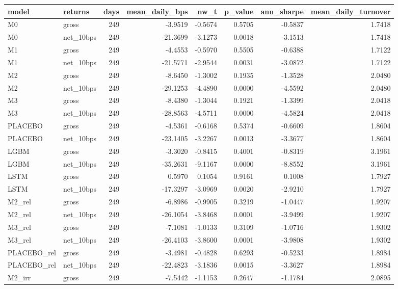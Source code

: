 \begin{tabular}{llrrrrrr}
\toprule
model & returns & days & mean\_daily\_bps & nw\_t & p\_value & ann\_sharpe & mean\_daily\_turnover \\
\midrule
M0 & gross & 249 & -3.9519 & -0.5674 & 0.5705 & -0.5837 & 1.7418 \\
M0 & net\_10bps & 249 & -21.3699 & -3.1273 & 0.0018 & -3.1513 & 1.7418 \\
M1 & gross & 249 & -4.4553 & -0.5970 & 0.5505 & -0.6388 & 1.7122 \\
M1 & net\_10bps & 249 & -21.5771 & -2.9544 & 0.0031 & -3.0872 & 1.7122 \\
M2 & gross & 249 & -8.6450 & -1.3002 & 0.1935 & -1.3528 & 2.0480 \\
M2 & net\_10bps & 249 & -29.1253 & -4.4890 & 0.0000 & -4.5592 & 2.0480 \\
M3 & gross & 249 & -8.4380 & -1.3044 & 0.1921 & -1.3399 & 2.0418 \\
M3 & net\_10bps & 249 & -28.8563 & -4.5711 & 0.0000 & -4.5824 & 2.0418 \\
PLACEBO & gross & 249 & -4.5361 & -0.6168 & 0.5374 & -0.6609 & 1.8604 \\
PLACEBO & net\_10bps & 249 & -23.1405 & -3.2267 & 0.0013 & -3.3677 & 1.8604 \\
LGBM & gross & 249 & -3.3020 & -0.8415 & 0.4001 & -0.8319 & 3.1961 \\
LGBM & net\_10bps & 249 & -35.2631 & -9.1167 & 0.0000 & -8.8552 & 3.1961 \\
LSTM & gross & 249 & 0.5970 & 0.1054 & 0.9161 & 0.1008 & 1.7927 \\
LSTM & net\_10bps & 249 & -17.3297 & -3.0969 & 0.0020 & -2.9210 & 1.7927 \\
M2\_rel & gross & 249 & -6.8986 & -0.9905 & 0.3219 & -1.0447 & 1.9207 \\
M2\_rel & net\_10bps & 249 & -26.1054 & -3.8468 & 0.0001 & -3.9499 & 1.9207 \\
M3\_rel & gross & 249 & -7.1081 & -1.0133 & 0.3109 & -1.0716 & 1.9302 \\
M3\_rel & net\_10bps & 249 & -26.4103 & -3.8600 & 0.0001 & -3.9808 & 1.9302 \\
PLACEBO\_rel & gross & 249 & -3.4981 & -0.4828 & 0.6293 & -0.5233 & 1.8984 \\
PLACEBO\_rel & net\_10bps & 249 & -22.4823 & -3.1836 & 0.0015 & -3.3627 & 1.8984 \\
M2\_irr & gross & 249 & -7.5442 & -1.1153 & 0.2647 & -1.1784 & 2.0895 \\

\end{tabular}
